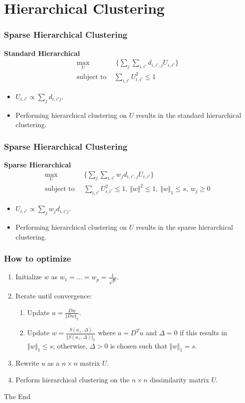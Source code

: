 \documentclass{beamer}
\begin{document}
\section{Hierarchical Clustering}
\begin{frame}
\frametitle{Sparse Hierarchical Clustering}
{\Large \bf Standard Hierarchical}
\begin{eqnarray*}
\max_U &~ \{ \sum_j \sum_{i,i'} d_{i,i',j} U_{i,i'} \} \\
\text{subject to } & \sum_{i,i'} U^2_{i,i'} \le 1
\end{eqnarray*}

\begin{itemize}
    \item $U_{i,i'} \propto \sum_j d_{i,i'j}$.
    \item Performing hierarchical clustering on $U$ results in the standard hierarchical clustering.
\end{itemize}

\end{frame}
\begin{frame}
\frametitle{Sparse Hierarchical Clustering}
{\Large \bf Sparse Hierarchical}
\begin{eqnarray*}
\max_U &~ \{ \sum_j \sum_{i,i'} w_j d_{i,i',j} U_{i,i'} \} \\
\text{subject to } &~ \sum_{i,i'} U^2_{i,i'} \le 1,~ \Vert w \Vert^2 \le 1,~ \Vert w \Vert_1 \le s, ~ w_j \ge 0
\end{eqnarray*}
\begin{itemize}
    \item $U_{i,i'} \propto \sum_j w_j d_{i,i'j}$.
    \item Performing hierarchical clustering on $U$ results in the sparse hierarchical clustering.
\end{itemize}

\end{frame}
\begin{frame}
\frametitle{How to optimize}
\begin{enumerate}
\item Initialize $w$ as $w_1=\ldots=w_p=\frac{1}{\sqrt{p}}$.
\item Iterate until convergence:
    \begin{enumerate}
        \item  Update $u = \frac{Dw}{\Vert Dw \Vert_2}$.
        \item  Update $w = \frac{S(a_{+},\Delta)}{\Vert S(a_{+},\Delta) \Vert_2}$ where $a = D^Tu$ and $\Delta = 0$ if this results in $\Vert w \Vert_1 \le s$; otherwise, $\Delta > 0$ is chosen such that $\Vert w \Vert_1 = s$.
    \end{enumerate}
\item Rewrite $u$ as a $n \times n$ matrix $U$.
\item Perform hierarchical clustering on the $n \times n$ dissimilarity matrix $U$.
\end{enumerate}
\end{frame}



\begin{frame}
\Huge{\centerline{The End}}
\end{frame}

\end{document}
